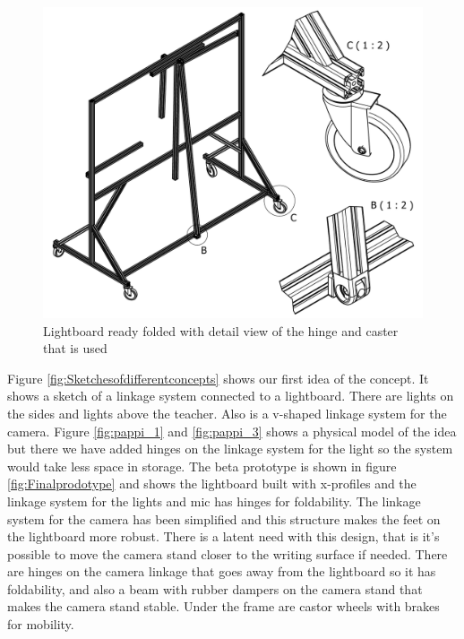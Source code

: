 \documentclass[a4paper]{jpconf}
\begin{document}
\begin{figure}
	\centering
	\includegraphics[width=1\linewidth]{frame2.pdf}
	\caption{Lightboard ready folded with detail view of the hinge and caster that is used}
	\label{fig:Finalprodotype2}
\end{figure}






Figure \ref{fig:Sketchesofdifferentconcepts} shows our first idea of the concept.  It shows a sketch of a linkage system connected to a lightboard.
There are lights on the sides and lights above the teacher.
Also is a v-shaped linkage system for the camera.
Figure \ref{fig:pappi_1} and \ref{fig:pappi_3} shows a physical model of the idea but there we have added hinges on the linkage system for the light so the system would take less space in storage.
The beta prototype is shown in figure \ref{fig:Finalprodotype} and shows the lightboard built with x-profiles and the linkage system for the lights and mic has hinges for foldability.
The linkage system for the camera has been simplified and this structure makes the feet on the lightboard more robust. There is a latent need with this design, that is it's possible to move the camera stand closer to the writing surface if needed.
There are hinges on the camera linkage that goes away from the lightboard so it has foldability, and also a beam with rubber dampers on the camera stand that makes the camera stand stable.
Under the frame are castor wheels with brakes for mobility.
\end{document}
